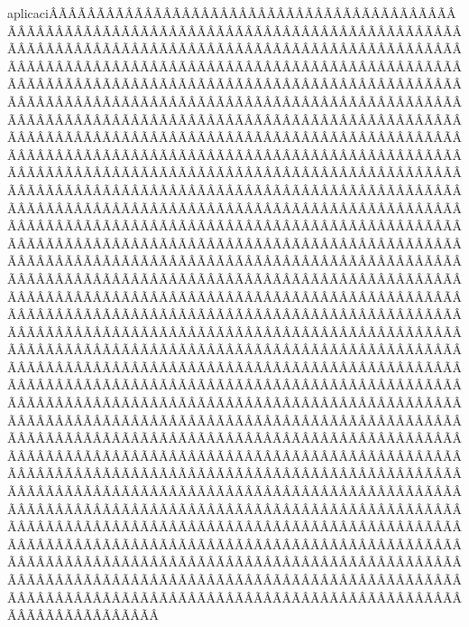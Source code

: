 \begin{sumilla}
\begin{fundamentacion}
aplicaci\ÃÂÃÂÃÂÃÂÃÂÃÂÃÂÃÂÃÂÃÂÃÂÃÂÃÂÃÂÃÂÃÂÃÂÃÂÃÂÃÂÃÂÃÂÃÂÃÂÃÂÃÂÃÂÃÂÃÂÃÂÃÂÃÂÃÂÃÂÃÂÃÂÃÂÃÂÃÂÃÂÃÂÃÂÃÂÃÂÃÂÃÂÃÂÃÂÃÂÃÂÃÂÃÂÃÂÃÂÃÂÃÂÃÂÃÂÃÂÃÂÃÂÃÂÃÂÃÂÃÂÃÂÃÂÃÂÃÂÃÂÃÂÃÂÃÂÃÂÃÂÃÂÃÂÃÂÃÂÃÂÃÂÃÂÃÂÃÂÃÂÃÂÃÂÃÂÃÂÃÂÃÂÃÂÃÂÃÂÃÂÃÂÃÂÃÂÃÂÃÂÃÂÃÂÃÂÃÂÃÂÃÂÃÂÃÂÃÂÃÂÃÂÃÂÃÂÃÂÃÂÃÂÃÂÃÂÃÂÃÂÃÂÃÂÃÂÃÂÃÂÃÂÃÂÃÂÃÂÃÂÃÂÃÂÃÂÃÂÃÂÃÂÃÂÃÂÃÂÃÂÃÂÃÂÃÂÃÂÃÂÃÂÃÂÃÂÃÂÃÂÃÂÃÂÃÂÃÂÃÂÃÂÃÂÃÂÃÂÃÂÃÂÃÂÃÂÃÂÃÂÃÂÃÂÃÂÃÂÃÂÃÂÃÂÃÂÃÂÃÂÃÂÃÂÃÂÃÂÃÂÃÂÃÂÃÂÃÂÃÂÃÂÃÂÃÂÃÂÃÂÃÂÃÂÃÂÃÂÃÂÃÂÃÂÃÂÃÂÃÂÃÂÃÂÃÂÃÂÃÂÃÂÃÂÃÂÃÂÃÂÃÂÃÂÃÂÃÂÃÂÃÂÃÂÃÂÃÂÃÂÃÂÃÂÃÂÃÂÃÂÃÂÃÂÃÂÃÂÃÂÃÂÃÂÃÂÃÂÃÂÃÂÃÂÃÂÃÂÃÂÃÂÃÂÃÂÃÂÃÂÃÂÃÂÃÂÃÂÃÂÃÂÃÂÃÂÃÂÃÂÃÂÃÂÃÂÃÂÃÂÃÂÃÂÃÂÃÂÃÂÃÂÃÂÃÂÃÂÃÂÃÂÃÂÃÂÃÂÃÂÃÂÃÂÃÂÃÂÃÂÃÂÃÂÃÂÃÂÃÂÃÂÃÂÃÂÃÂÃÂÃÂÃÂÃÂÃÂÃÂÃÂÃÂÃÂÃÂÃÂÃÂÃÂÃÂÃÂÃÂÃÂÃÂÃÂÃÂÃÂÃÂÃÂÃÂÃÂÃÂÃÂÃÂÃÂÃÂÃÂÃÂÃÂÃÂÃÂÃÂÃÂÃÂÃÂÃÂÃÂÃÂÃÂÃÂÃÂÃÂÃÂÃÂÃÂÃÂÃÂÃÂÃÂÃÂÃÂÃÂÃÂÃÂÃÂÃÂÃÂÃÂÃÂÃÂÃÂÃÂÃÂÃÂÃÂÃÂÃÂÃÂÃÂÃÂÃÂÃÂÃÂÃÂÃÂÃÂÃÂÃÂÃÂÃÂÃÂÃÂÃÂÃÂÃÂÃÂÃÂÃÂÃÂÃÂÃÂÃÂÃÂÃÂÃÂÃÂÃÂÃÂÃÂÃÂÃÂÃÂÃÂÃÂÃÂÃÂÃÂÃÂÃÂÃÂÃÂÃÂÃÂÃÂÃÂÃÂÃÂÃÂÃÂÃÂÃÂÃÂÃÂÃÂÃÂÃÂÃÂÃÂÃÂÃÂÃÂÃÂÃÂÃÂÃÂÃÂÃÂÃÂÃÂÃÂÃÂÃÂÃÂÃÂÃÂÃÂÃÂÃÂÃÂÃÂÃÂÃÂÃÂÃÂÃÂÃÂÃÂÃÂÃÂÃÂÃÂÃÂÃÂÃÂÃÂÃÂÃÂÃÂÃÂÃÂÃÂÃÂÃÂÃÂÃÂÃÂÃÂÃÂÃÂÃÂÃÂÃÂÃÂÃÂÃÂÃÂÃÂÃÂÃÂÃÂÃÂÃÂÃÂÃÂÃÂÃÂÃÂÃÂÃÂÃÂÃÂÃÂÃÂÃÂÃÂÃÂÃÂÃÂÃÂÃÂÃÂÃÂÃÂÃÂÃÂÃÂÃÂÃÂÃÂÃÂÃÂÃÂÃÂÃÂÃÂÃÂÃÂÃÂÃÂÃÂÃÂÃÂÃÂÃÂÃÂÃÂÃÂÃÂÃÂÃÂÃÂÃÂÃÂÃÂÃÂÃÂÃÂÃÂÃÂÃÂÃÂÃÂÃÂÃÂÃÂÃÂÃÂÃÂÃÂÃÂÃÂÃÂÃÂÃÂÃÂÃÂÃÂÃÂÃÂÃÂÃÂÃÂÃÂÃÂÃÂÃÂÃÂÃÂÃÂÃÂÃÂÃÂÃÂÃÂÃÂÃÂÃÂÃÂÃÂÃÂÃÂÃÂÃÂÃÂÃÂÃÂÃÂÃÂÃÂÃÂÃÂÃÂÃÂÃÂÃÂÃÂÃÂÃÂÃÂÃÂÃÂÃÂÃÂÃÂÃÂÃÂÃÂÃÂÃÂÃÂÃÂÃÂÃÂÃÂÃÂÃÂÃÂÃÂÃÂÃÂÃÂÃÂÃÂÃÂÃÂÃÂÃÂÃÂÃÂÃÂÃÂÃÂÃÂÃÂÃÂÃÂÃÂÃÂÃÂÃÂÃÂÃÂÃÂÃÂÃÂÃÂÃÂÃÂÃÂÃÂÃÂÃÂÃÂÃÂÃÂÃÂÃÂÃÂÃÂÃÂÃÂÃÂÃÂÃÂÃÂÃÂÃÂÃÂÃÂÃÂÃÂÃÂÃÂÃÂÃÂÃÂÃÂÃÂÃÂÃÂÃÂÃÂÃÂÃÂÃÂÃÂÃÂÃÂÃÂÃÂÃÂÃÂÃÂÃÂÃÂÃÂÃÂÃÂÃÂÃÂÃÂÃÂÃÂÃÂÃÂÃÂÃÂÃÂÃÂÃÂÃÂÃÂÃÂÃÂÃÂÃÂÃÂÃÂÃÂÃÂÃÂÃÂÃÂÃÂÃÂÃÂÃÂÃÂÃÂÃÂÃÂÃÂÃÂÃÂÃÂÃÂÃÂÃÂÃÂÃÂÃÂÃÂÃÂÃÂÃÂÃÂÃÂÃÂÃÂÃÂÃÂÃÂÃÂÃÂÃÂÃÂÃÂÃÂÃÂÃÂÃÂÃÂÃÂÃÂÃÂÃÂÃÂÃÂÃÂÃÂÃÂÃÂÃÂÃÂÃÂÃÂÃÂÃÂÃÂÃÂÃÂÃÂÃÂÃÂÃÂÃÂÃÂÃÂÃÂÃÂÃÂÃÂÃÂÃÂÃÂÃÂÃÂÃÂÃÂÃÂÃÂÃÂÃÂÃÂÃÂÃÂÃÂÃÂÃÂÃÂÃÂÃÂÃÂÃÂÃÂÃÂÃÂÃÂÃÂ
\end{fundamentacion}
\end{sumilla}

